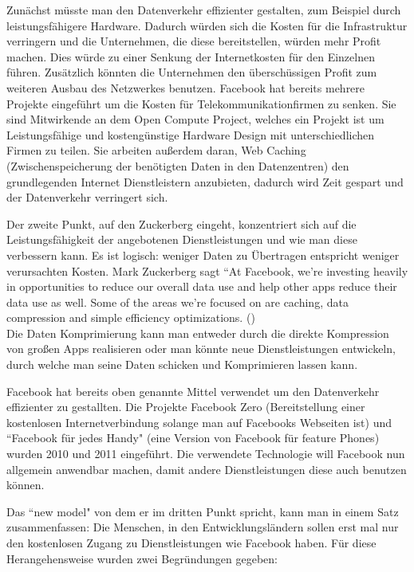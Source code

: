\documentclass{article}
\begin{document}
Zunächst müsste man den Datenverkehr effizienter gestalten, zum Beispiel durch leistungsfähigere Hardware.
Dadurch würden sich die Kosten für die Infrastruktur verringern und die Unternehmen, die diese bereitstellen, würden mehr Profit    
machen. Dies würde zu einer Senkung der Internetkosten für den Einzelnen führen.
Zusätzlich könnten die Unternehmen den überschüssigen Profit zum weiteren Ausbau des Netzwerkes benutzen.
Facebook hat bereits mehrere Projekte eingeführt um die Kosten für Telekommunikationfirmen zu senken.
Sie sind Mitwirkende an dem Open Compute Project, welches ein Projekt ist um Leistungsfähige und kostengünstige Hardware 
Design mit unterschiedlichen Firmen zu teilen.
Sie arbeiten außerdem daran, Web Caching (Zwischenspeicherung der benötigten Daten in den Datenzentren) den grundlegenden Internet Dienstleistern anzubieten, dadurch wird Zeit gespart und der Datenverkehr verringert sich.

\medskip

Der zweite Punkt, auf den Zuckerberg eingeht, konzentriert sich auf die Leistungsfähigkeit der angebotenen Dienstleistungen und wie man diese verbessern kann. Es ist logisch: weniger Daten zu Übertragen entspricht weniger verursachten Kosten. 
Mark Zuckerberg sagt ``At Facebook, we’re investing heavily in opportunities to reduce our overall data use and help  other apps     
reduce their data use as well. Some of the areas we’re focused on are caching, data compression and simple efficiency optimizations.
(\cite[8]{HumanRight})\\
Die Daten Komprimierung kann man entweder durch die direkte Kompression von großen Apps realisieren oder man könnte neue Dienstleistungen entwickeln, durch welche man seine Daten schicken und Komprimieren lassen kann.

\medskip

Facebook hat bereits oben genannte Mittel verwendet um den Datenverkehr effizienter zu gestallten.
Die Projekte Facebook Zero (Bereitstellung einer kostenlosen Internetverbindung solange man auf Facebooks Webseiten ist) und ``Facebook für jedes Handy" (eine Version von Facebook für feature Phones) wurden 2010 und 2011 eingeführt.
Die verwendete Technologie will Facebook nun allgemein anwendbar machen, damit andere Dienstleistungen diese auch benutzen können.

\medskip


Das ``new model" von dem er im dritten Punkt spricht, kann man in einem Satz zusammenfassen:
Die Menschen, in den Entwicklungsländern sollen erst mal nur den kostenlosen Zugang zu Dienstleistungen wie Facebook haben.
Für diese Herangehensweise wurden zwei Begründungen gegeben:
\end{document}
